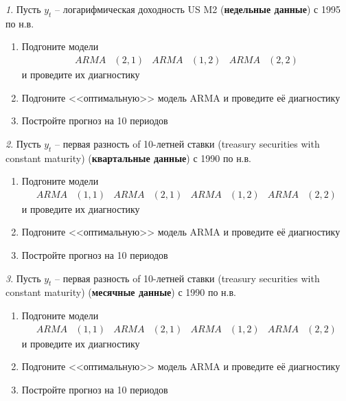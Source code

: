 \documentclass[12pt]{article}
\theoremstyle{remark}
\newtheorem{exercise}{}[subsection]
\begin{document}
\begin{exercise}
Пусть \(y_t\) -- логарифмическая доходность US M2 (\textbf{недельные данные}) с 1995 по н.в.
\begin{enumerate}
	\item Подгоните модели
	\begin{align*}
		ARMA&(2,1) & ARMA&(1,2) & ARMA&(2,2)
	\end{align*} 
	и проведите их диагностику
	\item Подгоните <<оптимальную>> модель ARMA и проведите её диагностику
	\item Постройте прогноз на 10 периодов
\end{enumerate}
\end{exercise}

\begin{exercise}
Пусть \(y_t\) -- первая разность of 10-летней ставки (treasury securities  with constant maturity) 
(\textbf{квартальные данные}) с 1990 по н.в.
\begin{enumerate}
	\item Подгоните модели
	\begin{align*}
		ARMA&(1,1) & ARMA&(2,1) & ARMA&(1,2) & ARMA&(2,2)
	\end{align*} 
	и проведите их диагностику
	\item Подгоните <<оптимальную>> модель ARMA и проведите её диагностику
	\item Постройте прогноз на 10 периодов
\end{enumerate}
\end{exercise}

\begin{exercise}
Пусть \(y_t\) -- первая разность of 10-летней ставки (treasury securities  with constant maturity) 
(\textbf{месячные данные}) с 1990 по н.в.
\begin{enumerate}
	\item Подгоните модели
	\begin{align*}
		ARMA&(1,1) & ARMA&(2,1) & ARMA&(1,2) & ARMA&(2,2)
	\end{align*} 
	и проведите их диагностику
	\item Подгоните <<оптимальную>> модель ARMA и проведите её диагностику
	\item Постройте прогноз на 10 периодов
\end{enumerate}
\end{exercise}
\end{document}
